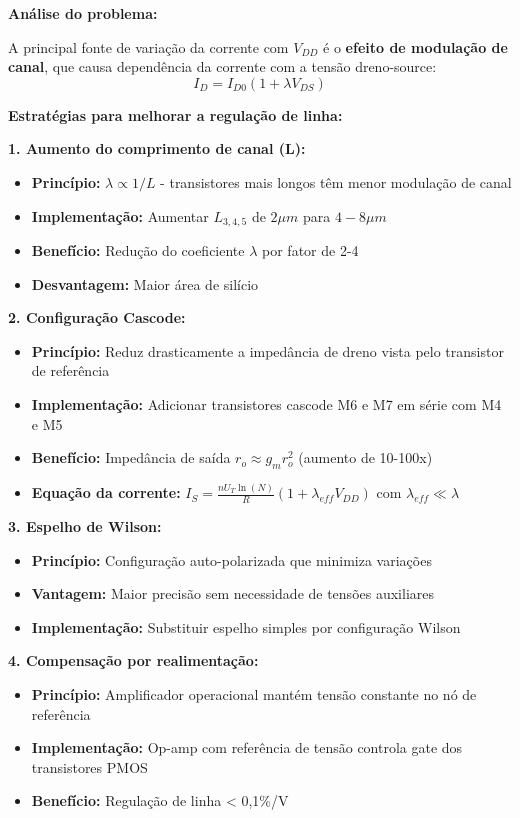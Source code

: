 \documentclass[12pt,a4paper]{article}
\begin{document}
\t\textbf{Análise do problema:}

A principal fonte de variação da corrente com $V_{DD}$ é o \t\textbf{efeito de modulação de canal}, que causa dependência da corrente com a tensão dreno-source:
$$I_D = I_{D0}(1 + \lambda V_{DS}) $$

\t\textbf{Estratégias para melhorar a regulação de linha:}

\t\textbf{1. Aumento do comprimento de canal (L):}
\begin{itemize}
    \item \t\textbf{Princípio:} $\lambda \propto 1/L$ - transistores mais longos têm menor modulação de canal
    \item \t\textbf{Implementação:} Aumentar $L_{3,4,5}$ de $2\mu m$ para $4-8\mu m$
    \item \t\textbf{Benefício:} Redução do coeficiente $\lambda$ por fator de 2-4
    \item \t\textbf{Desvantagem:} Maior área de silício
\end{itemize}

\t\textbf{2. Configuração Cascode:}
\begin{itemize}
    \item \t\textbf{Princípio:} Reduz drasticamente a impedância de dreno vista pelo transistor de referência
    \item \t\textbf{Implementação:} Adicionar transistores cascode M6 e M7 em série com M4 e M5
    \item \t\textbf{Benefício:} Impedância de saída $r_o \approx g_m r_o^2$ (aumento de 10-100x)
    \item \t\textbf{Equação da corrente:} $I_S = \frac{nU_T \ln(N)}{R}(1 + \lambda_{eff} V_{DD})$ com $\lambda_{eff} \ll \lambda$
\end{itemize}

\t\textbf{3. Espelho de Wilson:}
\begin{itemize}
    \item \t\textbf{Princípio:} Configuração auto-polarizada que minimiza variações
    \item \t\textbf{Vantagem:} Maior precisão sem necessidade de tensões auxiliares
    \item \t\textbf{Implementação:} Substituir espelho simples por configuração Wilson
\end{itemize}

\t\textbf{4. Compensação por realimentação:}
\begin{itemize}
    \item \t\textbf{Princípio:} Amplificador operacional mantém tensão constante no nó de referência
    \item \t\textbf{Implementação:} Op-amp com referência de tensão controla gate dos transistores PMOS
    \item \t\textbf{Benefício:} Regulação de linha < 0,1\%/V
\end{itemize}
\end{document}
